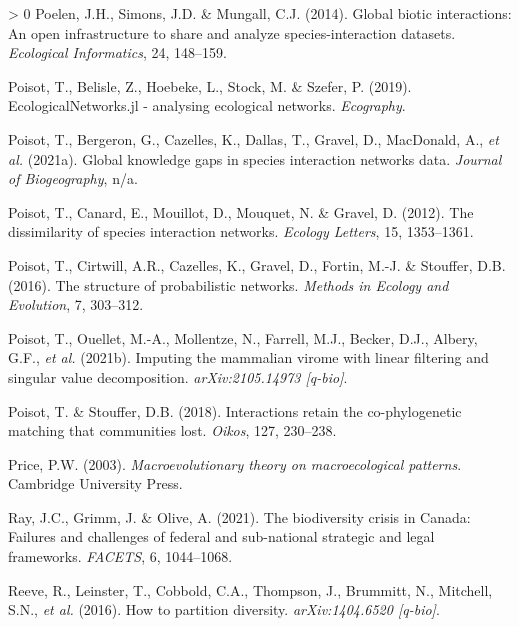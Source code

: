 \documentclass[10pt,oneside]{article}
\newlength{\cslhangindent}
\newenvironment{CSLReferences}[3] %
 {%
  \setlength{\parindent}{0pt}
  \ifodd #1 \everypar{\setlength{\hangindent}{\cslhangindent}}\ignorespaces\fi
  \ifnum #2 > 0
  \setlength{\parskip}{#2\baselineskip}
  \fi
 }%
 {}
\begin{document}
\begin{CSLReferences}{1}{0}
\leavevmode\hypertarget{ref-Poelen2014GloBio}{}%
Poelen, J.H., Simons, J.D. \& Mungall, C.J. (2014). Global biotic
interactions: An open infrastructure to share and analyze
species-interaction datasets. \emph{Ecological Informatics}, 24,
148--159.

\leavevmode\hypertarget{ref-Poisot2019EcoJl}{}%
Poisot, T., Belisle, Z., Hoebeke, L., Stock, M. \& Szefer, P. (2019).
EcologicalNetworks.jl - analysing ecological networks. \emph{Ecography}.

\leavevmode\hypertarget{ref-Poisot2021GloKno}{}%
Poisot, T., Bergeron, G., Cazelles, K., Dallas, T., Gravel, D.,
MacDonald, A., \emph{et al.} (2021a). Global knowledge gaps in species
interaction networks data. \emph{Journal of Biogeography}, n/a.

\leavevmode\hypertarget{ref-Poisot2012DisSpe}{}%
Poisot, T., Canard, E., Mouillot, D., Mouquet, N. \& Gravel, D. (2012).
The dissimilarity of species interaction networks. \emph{Ecology
Letters}, 15, 1353--1361.

\leavevmode\hypertarget{ref-Poisot2016StrPro}{}%
Poisot, T., Cirtwill, A.R., Cazelles, K., Gravel, D., Fortin, M.-J. \&
Stouffer, D.B. (2016). The structure of probabilistic networks.
\emph{Methods in Ecology and Evolution}, 7, 303--312.

\leavevmode\hypertarget{ref-Poisot2021ImpMam}{}%
Poisot, T., Ouellet, M.-A., Mollentze, N., Farrell, M.J., Becker, D.J.,
Albery, G.F., \emph{et al.} (2021b). Imputing the mammalian virome with
linear filtering and singular value decomposition.
\emph{arXiv:2105.14973 {[}q-bio{]}}.

\leavevmode\hypertarget{ref-Poisot2018IntRet}{}%
Poisot, T. \& Stouffer, D.B. (2018). Interactions retain the
co-phylogenetic matching that communities lost. \emph{Oikos}, 127,
230--238.

\leavevmode\hypertarget{ref-Price2003MacThe}{}%
Price, P.W. (2003). \emph{Macroevolutionary theory on macroecological
patterns}. Cambridge University Press.

\leavevmode\hypertarget{ref-Ray2021BioCri}{}%
Ray, J.C., Grimm, J. \& Olive, A. (2021). The biodiversity crisis in
Canada: Failures and challenges of federal and sub-national strategic
and legal frameworks. \emph{FACETS}, 6, 1044--1068.

\leavevmode\hypertarget{ref-Reeve2016HowPar}{}%
Reeve, R., Leinster, T., Cobbold, C.A., Thompson, J., Brummitt, N.,
Mitchell, S.N., \emph{et al.} (2016). How to partition diversity.
\emph{arXiv:1404.6520 {[}q-bio{]}}.


\end{CSLReferences}
\end{document}
